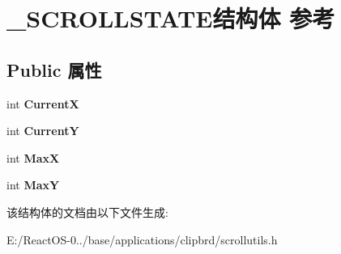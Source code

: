 \hypertarget{struct___s_c_r_o_l_l_s_t_a_t_e}{}\section{\+\_\+\+S\+C\+R\+O\+L\+L\+S\+T\+A\+T\+E结构体 参考}
\label{struct___s_c_r_o_l_l_s_t_a_t_e}
\subsection*{Public 属性}
\begin{DoxyCompactItemize}
\item 
\mbox{\label{struct___s_c_r_o_l_l_s_t_a_t_e_a251a563f70dda05dc4359a14c8176bab}} 
int {\bfseries CurrentX}
\item 
\mbox{\label{struct___s_c_r_o_l_l_s_t_a_t_e_acea9dceb2437feaca7cbdfa25319e32e}} 
int {\bfseries CurrentY}
\item 
\mbox{\label{struct___s_c_r_o_l_l_s_t_a_t_e_a507dfa68b00c3c357b093e4c2a3668a4}} 
int {\bfseries MaxX}
\item 
\mbox{\label{struct___s_c_r_o_l_l_s_t_a_t_e_af5961d77d38d54be2b7c562ea904e144}} 
int {\bfseries MaxY}
\end{DoxyCompactItemize}


该结构体的文档由以下文件生成\+:\begin{DoxyCompactItemize}
\item 
E\+:/\+React\+O\+S-\/0../base/applications/clipbrd/scrollutils.\+h\end{DoxyCompactItemize}
